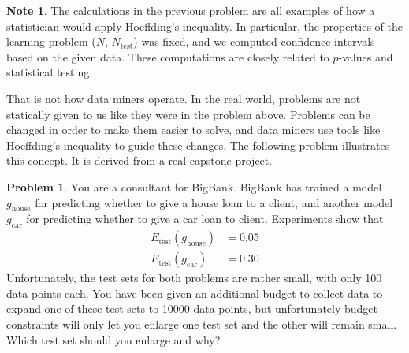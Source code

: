 \documentclass[10pt]{exam}
\theoremstyle{definition}
\newtheorem{problem}{Problem}
\newtheorem{note}{Note}
\newcommand{\Etest}{E_{\text{test}}}
\newcommand{\Ntest}{N_{\text{test}}}
\begin{document}
\newpage
\begin{note}
    The calculations in the previous problem are all examples of how a statistician would apply Hoeffding's inequality.
    In particular, the properties of the learning problem ($N$, $\Ntest$) was fixed,
    and we computed confidence intervals based on the given data.
    These computations are closely related to $p$-values and statistical testing.

    That is not how data miners operate.
    In the real world, problems are not statically given to us like they were in the problem above.
    Problems can be changed in order to make them easier to solve, and
    data miners use tools like Hoeffding's inequality to guide these changes.
    The following problem illustrates this concept.
    It is derived from a real capstone project.
\end{note}
\begin{problem}
            You are a consultant for BigBank.
            BigBank has trained a model $g_\text{house}$ for predicting whether to give a house loan to a client,
            and another model $g_\text{car}$ for predicting whether to give a car loan to client.
            Experiments show that
            \begin{align*}
                \Etest(g_\text{house}) &= 0.05 \\
                \Etest(g_\text{car}) &= 0.30
            \end{align*}
            Unfortunately, the test sets for both problems are rather small, with only 100 data points each.
            You have been given an additional budget to collect data to expand one of these test sets to 10000 data points,
            but unfortunately budget constraints will only let you enlarge one test set and the other will remain small.
            Which test set should you enlarge and why?
\end{problem}
\end{document}
